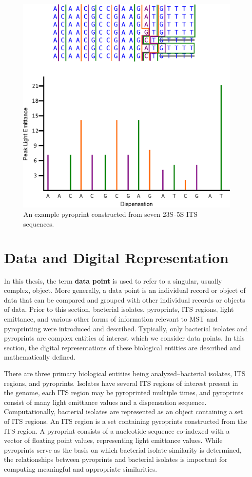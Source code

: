 \documentclass[12pt]{ucthesis}
\begin{document}
      \begin{figure}[t]
         \centering
         \includegraphics[width=0.70\columnwidth]{graphics/PyroprintExample.eps}
         \caption{An example pyroprint constructed from seven 23S--5S ITS
                  sequences.}
         \label{fig:pyroprint_example}
      \end{figure}

      \section{Data and Digital Representation}\label{sec:representation}
      In this thesis, the term \textbf{data point} is used to refer to a
      singular, usually complex, object. More generally, a data point is an
      individual record or object of data that can be compared and grouped with
      other individual records or objects of data. Prior to this section,
      bacterial isolates, pyroprints, ITS regions, light emittance, and various
      other forms of information relevant to MST and pyroprinting were
      introduced and described. Typically, only bacterial isolates and
      pyroprints are complex entities of interest which we consider data
      points. In this section, the digital representations of these biological
      entities are described and mathematically defined.

      There are three primary biological entities being analyzed--bacterial
      isolates, ITS regions, and pyroprints. Isolates have several ITS regions
      of interest present in the genome, each ITS region may be pyroprinted
      multiple times, and pyroprints consist of many light emittance values and
      a dispensation sequence. Computationally, bacterial isolates are
      represented as an object containing a set of ITS regions. An ITS region
      is a set containing pyroprints constructed from the ITS region. A
      pyroprint consists of a nucleotide sequence co-indexed with a vector of
      floating point values, representing light emittance values. While
      pyroprints serve as the basis on which bacterial isolate similarity is
      determined, the relationships between pyroprints and bacterial isolates
      is important for computing meaningful and appropriate similarities.
\end{document}
